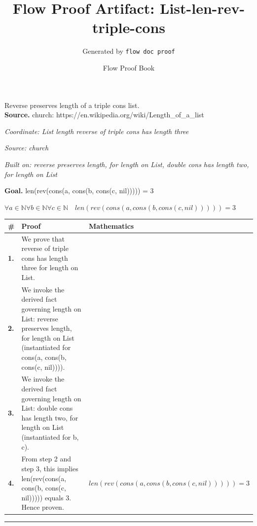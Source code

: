 \documentclass[11pt]{article}
\title{Flow Proof Artifact: List-len-rev-triple-cons}
\author{Generated by \texttt{flow doc proof}}
\date{Flow Proof Book}
\theoremstyle{definition}
\begin{document}
\maketitle
Reverse preserves length of a triple cons list.\\[0.5em]
\textbf{Source.} church: https://en.wikipedia.org/wiki/Length\_of\_a\_list\\[0.5em]
\bigskip
{}\par
\smallskip\noindent\textit{Coordinate: List \cdot length \cdot reverse of triple cons has length three}\par
\smallskip\noindent\textit{Source: church}\par
\smallskip\noindent\textit{Built on: reverse preserves length, for length on List, double cons has length two, for length on List}\par
\medskip
\noindent\textbf{Goal.} len(rev(cons(a, cons(b, cons(c, nil))))) = 3\par
\noindent$\displaystyle \forall a \in \mathbb{N} \forall b \in \mathbb{N} \forall c \in \mathbb{N}\quad len(rev(cons(a, cons(b, cons(c, nil))))) = 3$\par
\medskip
\noindent
\begin{tabular}{@{} >{\raggedright\arraybackslash}p{} >{\raggedright\arraybackslash}p{} >{\raggedleft\arraybackslash}p{} @{}}
\textbf{\#} & \textbf{Proof} & \textbf{Mathematics} \\
\midrule
\textbf{1.} & We prove that reverse of triple cons has length three for length on List. & \\[0.45em]
\textbf{2.} & We invoke the derived fact governing length on List: reverse preserves length, for length on List (instantiated for cons(a, cons(b, cons(c, nil)))). & \\[0.45em]
\textbf{3.} & We invoke the derived fact governing length on List: double cons has length two, for length on List (instantiated for b, c). & \\[0.45em]
\textbf{4.} & From step 2 and step 3, this implies len(rev(cons(a, cons(b, cons(c, nil))))) equals 3. Hence proven. & $\displaystyle len(rev(cons(a, cons(b, cons(c, nil))))) = 3$ \\[0.45em]
\bottomrule
\end{tabular}
\label{thm:List-length-reverse_of_triple_cons_has_length_three}
\par\medskip\hrule
\end{document}
